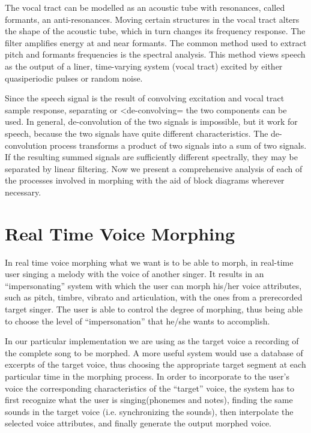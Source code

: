 \documentclass[12pt]{report}
\begin{document}
The  vocal  tract  can  be  modelled  as  an  acoustic  tube  with  resonances,  called  formants,  an  anti-resonances. Moving certain structures in the vocal tract alters the shape of the acoustic tube, which in turn changes its frequency response. The filter amplifies energy at and near formants. The common method used to extract pitch and formants frequencies is the spectral analysis. This method views speech as the output of a liner,  time-varying  system  (vocal tract) excited  by  either  quasiperiodic  pulses  or  random noise.
\newline


 Since  the speech  signal  is  the  result  of  convolving  excitation  and  vocal  tract  sample  response,  separating  or  <de-convolving= the two components can be used. In general, de-convolution of the two signals is impossible, but it work for speech, because the two signals have quite different characteristics. The de-convolution process transforms a product of two signals into a sum of two signals. If the resulting summed signals are sufficiently different spectrally, they may be separated by linear filtering. Now we present a comprehensive analysis of each of the processes involved in morphing with the aid of block diagrams wherever necessary.
\newline


\section{Real Time Voice Morphing}
In real time voice morphing what we want is to be able to morph, in real-time user
singing a melody with the voice of another singer. It results in an “impersonating” system with
which the user can morph his/her voice attributes, such as pitch, timbre, vibrato and articulation,
with the ones from a prerecorded target singer. The user is able to control the degree of
morphing, thus being able to choose the level of “impersonation” that he/she wants to
accomplish.
\newline

 In our particular implementation we are using as the target voice a recording of the
complete song to be morphed. A more useful system would use a database of excerpts of the
target voice, thus choosing the appropriate target segment at each particular time in the morphing
process. In order to incorporate to the user’s voice the corresponding characteristics of the
“target” voice, the system has to first recognize what the user is singing(phonemes and notes),
finding the same sounds in the target voice (i.e. synchronizing the sounds), then interpolate the
selected voice attributes, and finally generate the output morphed voice.
\newline
\end{document}
